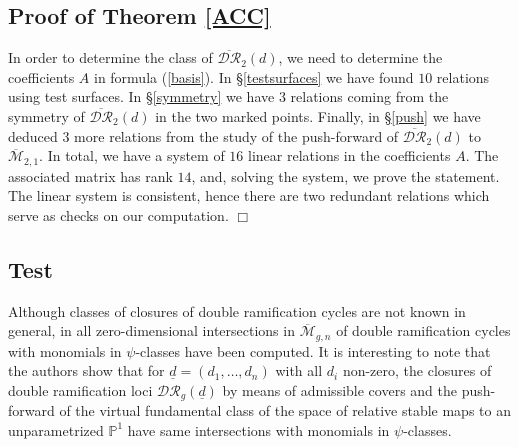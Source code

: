 \documentclass[10pt]{amsart}
\theoremstyle{definition}
\begin{document}
\subsection{Proof of Theorem \ref{ACC}}
In order to determine the class of $\overline{\mathcal{DR}}_2(d)$, we need to determine the coefficients $A$ in formula (\ref{basis}). In \S\ref{testsurfaces} we have found $10$ relations using test surfaces. In \S\ref{symmetry} we have $3$ relations coming from the symmetry of  $\overline{\mathcal{DR}}_2(d)$ in the two marked points. Finally, in \S\ref{push} we have deduced $3$ more relations from the study of the push-forward of $\overline{\mathcal{DR}}_2(d)$ to ${\overline{\mathcal{M}}}_{2,1}$. In total, we have a system of $16$ linear relations in the coefficients $A$. The associated matrix has rank $14$, and, solving the system, we prove the statement. The linear system is consistent, hence there are two  redundant relations which serve as checks on our computation. \hfill$\Box$

\subsection{Test}
Although classes of closures of double ramification cycles are not known in general, in \cite{BSSZ} all zero-dimensional intersections in ${\overline{\mathcal{M}}}_{g,n}$ of double ramification cycles with monomials in $\psi$-classes have been computed. It is interesting to note that the authors show that for $\underline{d}=(d_1,\dots,d_n)$ with all $d_i$ non-zero, the closures of double ramification loci $\mathcal{DR}_g(\underline{d})$ by means of admissible covers and the push-forward of the virtual fundamental class of the space of relative stable maps to an unparametrized $\mathbb{P}^1$ have same intersections with monomials in $\psi$-classes.
\end{document}
